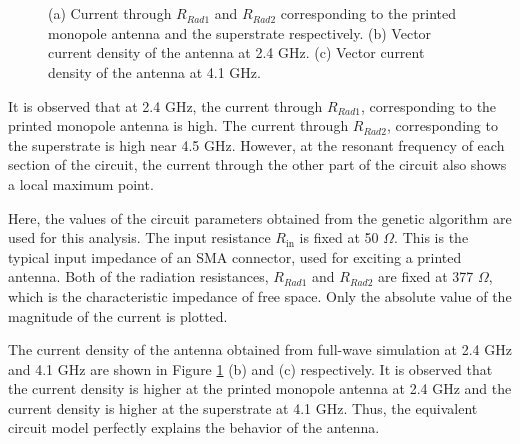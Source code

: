 \begin{figure}
\centering
{}\\
~~~
\caption{(a) Current through $R_{Rad1}$ and $R_{Rad2}$ corresponding to the printed monopole antenna and the superstrate respectively. (b) Vector current density of the antenna at 2.4 GHz. (c) Vector current density of the antenna at 4.1 GHz.}\label{fig-ckt-current}
\end{figure}

It is observed that at 2.4 GHz, the current through $R_{Rad1}$, corresponding to the printed monopole antenna is high. The current through $R_{Rad2}$, corresponding to the superstrate is high near 4.5 GHz. However, at the resonant frequency of each section of the circuit, the current through the other part of the circuit also shows a local maximum point.

Here, the values of the circuit parameters obtained from the genetic algorithm are used for this analysis. The input resistance $R_{\text{in}}$ is fixed at 50 $\Omega$. This is the typical input impedance of an SMA connector, used for exciting a printed antenna. Both of the radiation resistances, $R_{Rad1}$ and $R_{Rad2}$ are fixed at 377 $\Omega$, which is the characteristic impedance of free space. Only the absolute value of the magnitude of the current is plotted.

The current density of the antenna obtained from full-wave simulation at 2.4 GHz and 4.1 GHz are shown in Figure \ref{fig-ckt-current} (b) and (c) respectively. It is observed that the current density is higher at the printed monopole antenna at 2.4 GHz and the current density is higher at the superstrate at 4.1 GHz. Thus, the equivalent circuit model perfectly explains the behavior of the antenna.

